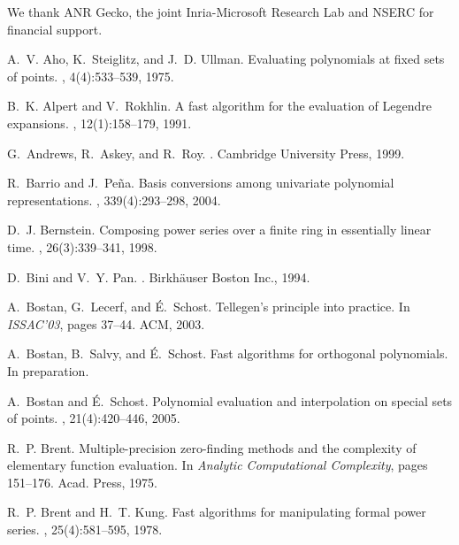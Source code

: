 \documentclass{sig-alternate}
\begin{document}
\smallskip{} We thank ANR Gecko, the
joint Inria-Microsoft Research Lab and NSERC for financial support.

\scriptsize
\begin{thebibliography}{10}

A.~V. Aho, K.~Steiglitz, and J.~D. Ullman.
\newblock Evaluating polynomials at fixed sets of points.
, 4(4):533--539, 1975.

B.~K. Alpert and V.~Rokhlin.
\newblock A fast algorithm for the evaluation of {L}egendre expansions.
, 12(1):158--179, 1991.

G.~Andrews, R.~Askey, and R.~Roy.
.
\newblock Cambridge University Press, 1999.

R.~Barrio and J.~Pe{\~n}a.
\newblock Basis conversions among univariate polynomial representations.
, 339(4):293--298, 2004.

D.~J. Bernstein.
\newblock Composing power series over a finite ring in essentially linear time.
, 26(3):339--341, 1998.

D.~Bini and V.~Y. Pan.
.
\newblock Birkh{\"a}user Boston Inc., 1994.

A.~Bostan, G.~Lecerf, and {\'E}.~Schost.
\newblock Tellegen's principle into practice.
\newblock In {\em ISSAC'03}, pages 37--44. ACM, 2003.

A.~Bostan, B.~Salvy, and {\'E}.~Schost.
\newblock Fast algorithms for orthogonal polynomials.
\newblock In preparation.

A.~Bostan and {\'E}.~Schost.
\newblock Polynomial evaluation and interpolation on special sets of points.
, 21(4):420--446, 2005.

R.~P. Brent.
\newblock Multiple-precision zero-finding methods and the complexity of
  elementary function evaluation.
\newblock In {\em Analytic Computational Complexity}, pages 151--176. Acad.
  Press, 1975.

R.~P. Brent and H.~T. Kung.
\newblock Fast algorithms for manipulating formal power series.
, 25(4):581--595, 1978.


\end{thebibliography}
\end{document}
